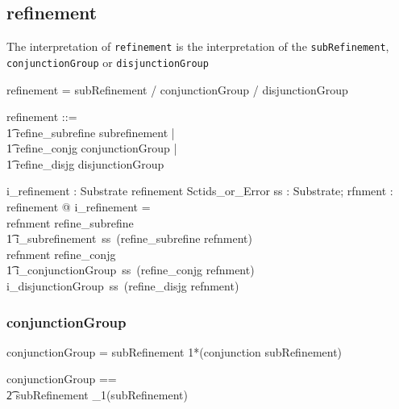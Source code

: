 \documentclass{article}
\def\spec#1{{\tt #1}}
\def\bnf#1{{\scriptsize {{#1}} }}
\begin{document}
\subsection{refinement}
The interpretation of \spec{refinement} is the interpretation of the \spec{subRefinement}, \spec{conjunctionGroup} or \spec{disjunctionGroup}
\begin{framed}
\noindent
\bnf{refinement = subRefinement / conjunctionGroup / disjunctionGroup}
\end{framed}

\begin{zed}
refinement ::= \\
\t1 refine\_subrefine \ldata subrefinement \rdata | \\
\t1 refine\_conjg \ldata conjunctionGroup \rdata | \\
\t1 refine\_disjg \ldata disjunctionGroup \rdata
\end{zed}

\begin{gendef}
   i\_refinement : Substrate \fun refinement \fun Sctids\_or\_Error
\where
   \forall ss : Substrate; rfnment : refinement @ i\_refinement = \\
   \IF refnment \in \ran refine\_subrefine \\
\t1 \THEN i\_subrefinement~ss~(refine\_subrefine \inv refnment) \\
   \ELSE \IF refnment \in \ran refine\_conjg \\
\t1 \THEN i\_conjunctionGroup~ss~(refine\_conjg \inv refnment) \\
   \ELSE i\_disjunctionGroup~ss~(refine\_disjg \inv refnment)
\end{gendef}

\subsubsection{conjunctionGroup}
\begin{framed}
\noindent
\bnf{conjunctionGroup = subRefinement 1*(conjunction subRefinement)}
\end{framed}

\begin{zed}
conjunctionGroup == \\
\t2 subRefinement \cross \seq_1(subRefinement)
\end{zed}
\end{document}
